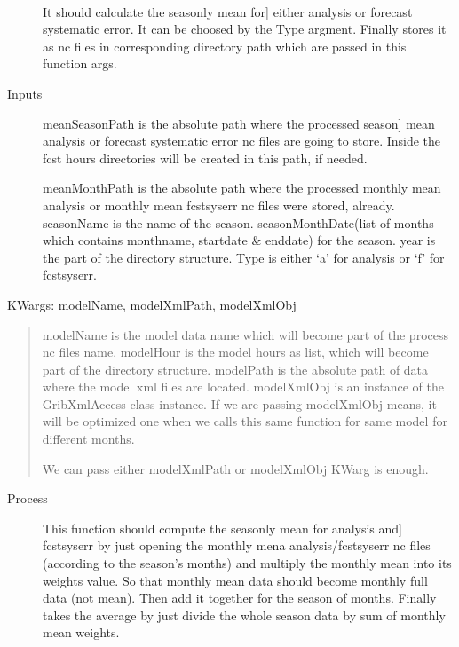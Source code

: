 \documentclass[letterpaper,10pt,english]{sphinxmanual}
\begin{document}
\begin{fulllineitems}
\label{diagnosis:compute_season_mean.genSeasonMeanFiles}~\begin{description}
\item[{}] \leavevmode{[}It should calculate the seasonly mean for{]}
either analysis or forecast systematic error. It can be choosed by
the Type argment. Finally stores it as nc files in corresponding
directory path which are passed in this function args.

\item[{Inputs}] \leavevmode{[}meanSeasonPath is the absolute path where the processed season{]}
mean analysis or forecast systematic error nc files are going to
store. Inside the fcst hours directories will be created in this
path, if needed.

meanMonthPath is the absolute path where the processed monthly
mean analysis or monthly mean fcstsyserr nc files were stored,
already.
seasonName is the name of the season.
seasonMonthDate(list of months which contains monthname,
startdate \& enddate) for the season.
year is the part of the directory structure.
Type is either `a' for analysis or `f' for fcstsyserr.

\end{description}

KWargs: modelName, modelXmlPath, modelXmlObj
\begin{quote}

modelName is the model data name which will become part of the
process nc files name.
modelHour is the model hours as list, which will become part of
the directory structure.
modelPath is the absolute path of data where the model xml files
are located.
modelXmlObj is an instance of the GribXmlAccess class instance.
If we are passing modelXmlObj means, it will be optimized one
when we calls this same function for same model for different
months.

We can pass either modelXmlPath or modelXmlObj KWarg is enough.
\end{quote}
\begin{description}
\item[{Process}] \leavevmode{[}This function should compute the seasonly mean for analysis and{]}
fcstsyserr by just opening the monthly mena analysis/fcstsyserr
nc files (according to the season's months) and multiply the
monthly mean into its weights value. So that monthly mean data
should become monthly full data (not mean). Then add it together
for the season of months. Finally takes the average by just
divide the whole season data by sum of monthly mean weights.
\begin{quote}


\end{quote}
\end{description}
\end{fulllineitems}
\end{document}

